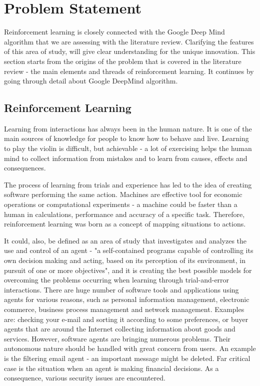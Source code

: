 \documentclass{article}
\begin{document}
\section{{\textbf{Problem Statement}}}

Reinforcement learning is closely connected with the Google Deep Mind algorithm that we are assessing with the literature review. Clarifying the features of this area of study, will give clear understanding for the unique innovation. This section starts from the origins of the problem that is covered in the literature review - the main elements and threads of reinforcement learning. It continues by going through detail about Google DeepMind algorithm.

\subsection{Reinforcement Learning}
Learning from interactions has always been in the human nature. It is one of the main sources of knowledge for people to know how to behave and live. Learning to play the violin is difficult, but achievable - a lot of exercising helps the human mind to collect information from mistakes and to learn from causes, effects and consequences.\cite[Ch.\ 1, p. 3]{sutton1998reinforcement}

The process of learning from trials and experience has led to the idea of creating software performing the same action. Machines are effective tool for economic operations or computational experiments - a machine could be faster than a human in calculations, performance and accuracy of a specific task. Therefore, reinforcement learning was born as a concept of mapping situations to actions. \cite[Ch.\ 1, p. 16]{sutton1998reinforcement} 

It could, also, be defined as an area of study that investigates and analyzes the use and control of an agent - "a self-contained programs capable of controlling its own decision making and acting, based on its perception of its environment, in pursuit of one or more objectives"\cite{jennings1996software}, and it is creating the best possible models for overcoming the problems occurring when learning through trial-and-error interactions\cite{kaelbling1996reinforcement}. There are huge number of software tools and applications using agents for various reasons, such as personal information management, electronic commerce, business process management and network management\cite{jennings1996software}. Examples are: checking your e-mail and sorting it according to some preferences, or buyer agents that are around the Internet collecting information about goods and services\cite{wikiAgent}. However, software agents are bringing numerous problems. Their autonomous nature should be handled with great concern from users. An example is the filtering email agent - an important message might be deleted. Far critical case is the situation when an agent is making financial decisions\cite{norman1994might}. As a consequence, various security issues are encountered.
\end{document}
